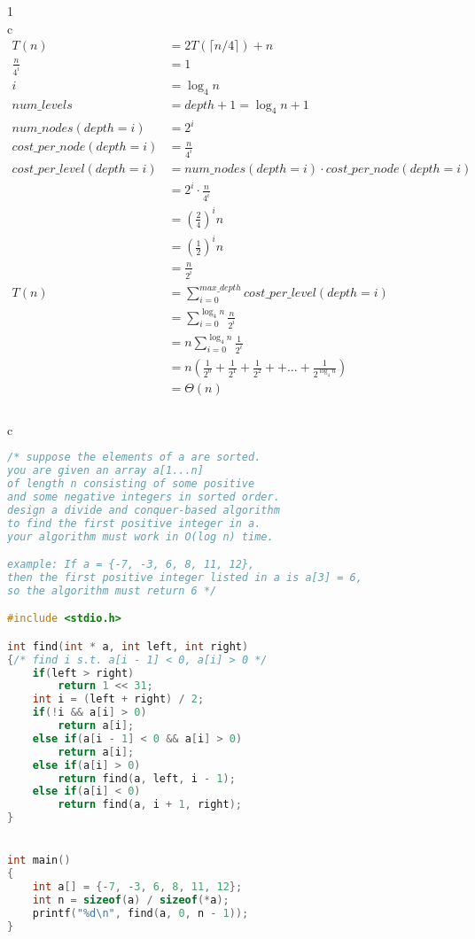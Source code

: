 \documentclass[12pt,border=4pt,multi]{article} %
\begin{document}
\section*{}
1\\
c
\begin{align*}
T(n) &= 2T(\lceil n / 4 \rceil) + n\\
\frac{n}{4^i} &= 1\\
i &= \log_4 n\\
num\_levels &= depth + 1 = \log_4 n + 1\\ 
num\_nodes(depth = i) &= 2^i\\ 
cost\_per\_node(depth = i) &= \frac{n}{4^i}\\
cost\_per\_level(depth = i) &= num\_nodes(depth = i) \cdot cost\_per\_node(depth = i)\\
&= 2^i \cdot \frac{n}{4^i}\\
&= \left(\frac{2}{4}\right)^i n\\
&= \left(\frac{1}{2}\right)^i n\\
&= \frac{n}{2^i}\\
T(n) &= \sum_{i = 0}^{max\_depth} cost\_per\_level(depth = i)\\
&= \sum_{i = 0}^{\log_4 n} \frac{n}{2^i}\\
&= n\sum_{i = 0}^{\log_4 n} \frac{1}{2^i}\\
&= n\left(\frac{1}{2^0} + \frac{1}{2^1} + \frac{1}{2^2} + + ... + \frac{1}{2^{\log_4 n}}\right)\\
&= \Theta(n)\\
\end{align*}
\newpage
{}\\
c
\begin{lstlisting}[language = c]
/* suppose the elements of a are sorted.
you are given an array a[1...n] 
of length n consisting of some positive
and some negative integers in sorted order.
design a divide and conquer-based algorithm
to find the first positive integer in a. 
your algorithm must work in O(log n) time. 

example: If a = {-7, -3, 6, 8, 11, 12}, 
then the first positive integer listed in a is a[3] = 6, 
so the algorithm must return 6 */

#include <stdio.h>

int find(int * a, int left, int right)
{/* find i s.t. a[i - 1] < 0, a[i] > 0 */
    if(left > right)
        return 1 << 31;
    int i = (left + right) / 2;
    if(!i && a[i] > 0)
        return a[i];
    else if(a[i - 1] < 0 && a[i] > 0)
        return a[i];
    else if(a[i] > 0)
        return find(a, left, i - 1);
    else if(a[i] < 0)
        return find(a, i + 1, right);
}


int main()
{
    int a[] = {-7, -3, 6, 8, 11, 12};
    int n = sizeof(a) / sizeof(*a);
    printf("%d\n", find(a, 0, n - 1));
}
\end{lstlisting}
\end{document}
